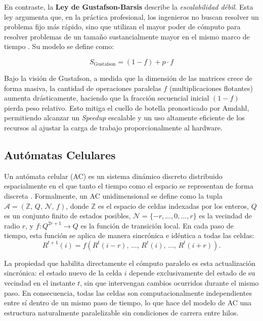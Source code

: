 En contraste, la \textbf{Ley de Gustafson-Barsis} describe la \textit{escalabilidad débil}. Esta ley argumenta que, en la práctica profesional, los ingenieros no buscan resolver un problema fijo más rápido, sino que utilizan el mayor poder de cómputo para resolver problemas de un tamaño sustancialmente mayor en el mismo marco de tiempo \parencite{Gustafson1988Reevaluating}. Su modelo se define como:

\begin{equation}
    S_{\text{Gustafson}} = (1 - f) + p \cdot f
\end{equation}

Bajo la visión de Gustafson, a medida que la dimensión de las matrices crece de forma masiva, la cantidad de operaciones paralelas \(f\) (multiplicaciones flotantes) aumenta drásticamente, haciendo que la fracción secuencial inicial \((1 - f)\) pierda peso relativo. Esto mitiga el cuello de botella pronosticado por Amdahl, permitiendo alcanzar un \textit{Speedup} escalable y un uso altamente eficiente de los recursos al ajustar la carga de trabajo proporcionalmente al hardware.


\subsection{Autómatas Celulares}

Un autómata celular (AC) es un sistema dinámico discreto distribuido
espacialmente en el que tanto el tiempo como el espacio se representan
de forma discreta \parencite{Wolfram1984}. Formalmente, un AC
unidimensional se define como la tupla $\mathcal{A} = (\mathbb{Z},\, Q,\,
\mathcal{N},\, f)$, donde $\mathbb{Z}$ es el espacio de celdas indexadas
por los enteros, $Q$ es un conjunto finito de estados posibles,
$\mathcal{N} = \{-r, \ldots, 0, \ldots, r\}$ es la vecindad de radio $r$,
y $f : Q^{2r+1} \to Q$ es la función de transición local. En cada paso
de tiempo, esta función se aplica de manera sincrónica e idéntica a todas
las celdas:
\[
  R^{t+1}(i) = f\!\left(R^t(i-r),\, \ldots,\, R^t(i),\, \ldots,\,
  R^t(i+r)\right).
\]

La propiedad que habilita directamente el cómputo paralelo es esta
actualización sincrónica: el estado nuevo de la celda $i$ depende
exclusivamente del estado de su vecindad en el instante $t$, sin que
intervengan cambios ocurridos durante el mismo paso. En consecuencia,
todas las celdas son computacionalmente independientes entre sí dentro
de un mismo paso de tiempo, lo que hace del modelo de AC una estructura
naturalmente paralelizable sin condiciones de carrera entre hilos.

